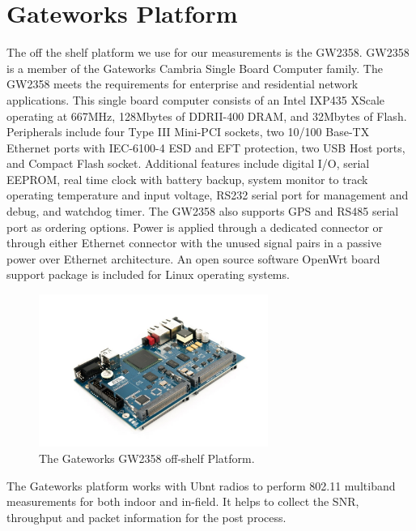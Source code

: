 \section{Gateworks Platform}

The off the shelf platform we use for our measurements is the GW2358. 
GW2358 is a member of the Gateworks Cambria Single Board Computer family. 
The GW2358 meets the requirements for enterprise and residential network 
applications. This single board computer consists of an Intel IXP435 XScale 
operating at 667MHz, 128Mbytes of DDRII-400 DRAM, and 32Mbytes of Flash. 
Peripherals include four Type III Mini-PCI sockets, two 10/100 Base-TX 
Ethernet ports with IEC-6100-4 ESD and EFT protection, two USB Host ports, 
and Compact Flash socket. Additional features include digital I/O, serial 
EEPROM, real time clock with battery backup, system monitor to track 
operating temperature and input voltage, RS232 serial port for management 
and debug, and watchdog timer. The GW2358 also supports GPS and RS485 
serial port as ordering options. Power is applied through a dedicated 
connector or through either Ethernet connector with the unused signal 
pairs in a passive power over Ethernet architecture. 
An open source software OpenWrt board support package is included 
for Linux operating systems.


\begin{figure} 
\centering
\includegraphics[width=75mm]{figures/gw2358}
\vspace{-0.1in}
\caption{The Gateworks GW2358 off-shelf Platform.}
\label{fig:gw2358}
\vspace{0.1in}
\end{figure}



The Gateworks platform works with Ubnt radios to perform 802.11 
multiband measurements for both indoor and in-field. It helps to 
collect the SNR, throughput and packet information for the post 
process. 

